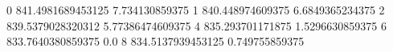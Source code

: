 0 841.4981689453125 7.734130859375
1 840.448974609375 6.6849365234375
2 839.5379028320312 5.77386474609375
4 835.293701171875 1.5296630859375
6 833.7640380859375 0.0
8 834.5137939453125 0.749755859375
